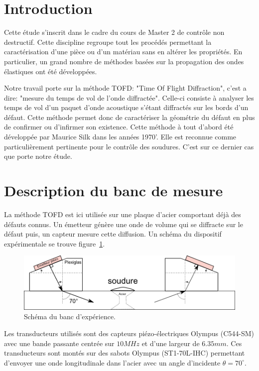 \documentclass[twoside]{article}
\begin{document}
\begin{multicols}{2} %

\section{Introduction}
Cette étude s'inscrit dans le cadre du cours de Master 2 de contrôle non destructif. Cette discipline regroupe tout les procédés permettant la caractérisation d'une pièce ou d'un matériau sans en altérer les propriétés. En particulier, un grand nombre de méthodes basées sur la propagation des ondes élastiques ont été développées.

Notre travail porte sur la méthode TOFD: "Time Of Flight Diffraction", c'est a dire: "mesure du temps de vol de l'onde diffractée". Celle-ci consiste à analyser les temps de vol d'un paquet d'onde acoustique s'étant diffractés sur les bords d'un défaut. Cette méthode permet donc de caractériser la géométrie du défaut en plus de confirmer ou d'infirmer son existence. Cette méthode à tout d'abord été développée par Maurice Silk  \cite{artfonda1} dans les années 1970'. Elle est reconnue comme particulièrement pertinente pour le contrôle des soudures. C'est sur ce dernier cas que porte notre étude.


\section{Description du banc de mesure}
La méthode TOFD est ici utilisée sur une plaque d'acier comportant déjà des défauts connus. Un émetteur génère une onde de volume qui se diffracte sur le défaut puis, un capteur mesure cette diffusion. Un schéma du dispositif expérimentale se trouve figure~\ref{schema1}.
\bigskip

\begin{figure}[H]
\includegraphics[scale=0.5]{./images/schema_expe.png}
\caption{\label{schema1} Schéma du banc d'expérience. }
\end{figure}

Les transducteurs utilisés sont des capteurs piézo-électriques Olympus (C544-SM) avec une bande passante centrée sur $10 MHz$ et d'une largeur de $6.35 mm$. Ces transducteurs sont montés sur des sabots Olympus (ST1-70L-IHC) permettant d'envoyer une onde longitudinale dans l'acier avec un angle d'incidente $\theta = 70 ^\circ$.


\end{multicols}
\end{document}
